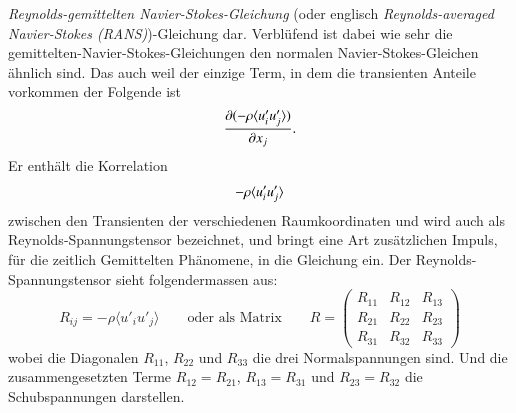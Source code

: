 \emph{Reynolds-gemittelten Navier-Stokes-Gleichung} (oder englisch \emph{Reynolds-averaged
Navier-Stokes (RANS)})-Gleichung dar.
Verblüfend ist dabei wie sehr die gemittelten-Navier-Stokes-Gleichungen den normalen Navier-Stokes-Gleichen ähnlich sind.
Das auch weil der einzige Term, in dem die transienten Anteile vorkommen der Folgende ist
%
\begin{equation*}
    \frac{\partial(- \rho \ravg{u_i' u_j'})}{\partial x_j}.
\end{equation*}
%
Er enthält die Korrelation
%
\[
- \rho \ravg{u_i' u_j'}
\]
%
zwischen den Transienten der verschiedenen Raumkoordinaten und wird auch als Reynolds-Spannungstensor
bezeichnet, und bringt eine Art zusätzlichen Impuls, für die zeitlich Gemittelten Phänomene, in die Gleichung ein.
Der Reynolds-Spannungstensor sieht folgendermassen aus:
%
\begin{equation*}
    R_{ij} = -\rho \langle u'_iu'_j\rangle
    \qquad\text{oder als Matrix}\qquad
    R
    =
    \begin{pmatrix}
        R_{11} & R_{12} & R_{13} \\
        R_{21} & R_{22} & R_{23} \\
        R_{31} & R_{32} & R_{33}
    \end{pmatrix}
\end{equation*}
%
wobei die Diagonalen $R_{11}$, $R_{22}$ und $R_{33}$ die drei Normalspannungen sind.
Und die zusammengesetzten Terme $R_{12} = R_{21}$, $R_{13} = R_{31}$ und $R_{23} = R_{32}$ die Schubspannungen darstellen.
%
